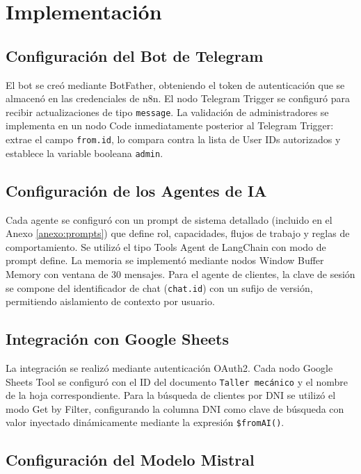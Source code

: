 \documentclass[12pt,a4paper]{report}
\begin{document}
\chapter{Implementación}

\section{Configuración del Bot de Telegram}

El bot se creó mediante BotFather, obteniendo el token de autenticación que se almacenó en las credenciales de n8n. El nodo Telegram Trigger se configuró para recibir actualizaciones de tipo \texttt{message}. La validación de administradores se implementa en un nodo Code inmediatamente posterior al Telegram Trigger: extrae el campo \texttt{from.id}, lo compara contra la lista de User IDs autorizados y establece la variable booleana \texttt{admin}.

\section{Configuración de los Agentes de IA}

Cada agente se configuró con un prompt de sistema detallado (incluido en el Anexo \ref{anexo:prompts}) que define rol, capacidades, flujos de trabajo y reglas de comportamiento. Se utilizó el tipo Tools Agent de LangChain con modo de prompt define. La memoria se implementó mediante nodos Window Buffer Memory con ventana de 30 mensajes. Para el agente de clientes, la clave de sesión se compone del identificador de chat (\texttt{chat.id}) con un sufijo de versión, permitiendo aislamiento de contexto por usuario.

\section{Integración con Google Sheets}

La integración se realizó mediante autenticación OAuth2. Cada nodo Google Sheets Tool se configuró con el ID del documento \texttt{Taller mecánico} y el nombre de la hoja correspondiente. Para la búsqueda de clientes por DNI se utilizó el modo Get by Filter, configurando la columna DNI como clave de búsqueda con valor inyectado dinámicamente mediante la expresión \texttt{\$fromAI()}.

\section{Configuración del Modelo Mistral}
\end{document}
